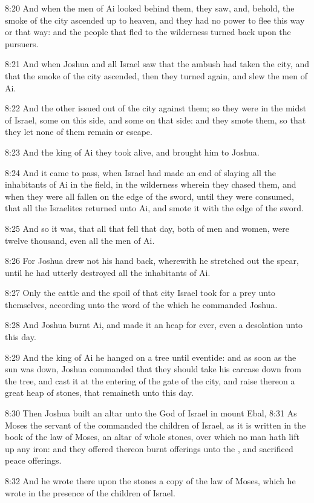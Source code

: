 8:20 And when the men of Ai looked behind them, they saw, and, behold, the smoke of the city ascended up to heaven, and they had no power to flee this way or that way: and the people that fled to the wilderness turned back upon the pursuers.

8:21 And when Joshua and all Israel saw that the ambush had taken the city, and that the smoke of the city ascended, then they turned again, and slew the men of Ai.

8:22 And the other issued out of the city against them; so they were in the midst of Israel, some on this side, and some on that side: and they smote them, so that they let none of them remain or escape.

8:23 And the king of Ai they took alive, and brought him to Joshua.

8:24 And it came to pass, when Israel had made an end of slaying all the inhabitants of Ai in the field, in the wilderness wherein they chased them, and when they were all fallen on the edge of the sword, until they were consumed, that all the Israelites returned unto Ai, and smote it with the edge of the sword.

8:25 And so it was, that all that fell that day, both of men and women, were twelve thousand, even all the men of Ai.

8:26 For Joshua drew not his hand back, wherewith he stretched out the spear, until he had utterly destroyed all the inhabitants of Ai.

8:27 Only the cattle and the spoil of that city Israel took for a prey unto themselves, according unto the word of the \LORD which he commanded Joshua.

8:28 And Joshua burnt Ai, and made it an heap for ever, even a desolation unto this day.

8:29 And the king of Ai he hanged on a tree until eventide: and as soon as the sun was down, Joshua commanded that they should take his carcase down from the tree, and cast it at the entering of the gate of the city, and raise thereon a great heap of stones, that remaineth unto this day.

8:30 Then Joshua built an altar unto the \LORD God of Israel in mount Ebal, 8:31 As Moses the servant of the \LORD commanded the children of Israel, as it is written in the book of the law of Moses, an altar of whole stones, over which no man hath lift up any iron: and they offered thereon burnt offerings unto the \LORD, and sacrificed peace offerings.

8:32 And he wrote there upon the stones a copy of the law of Moses, which he wrote in the presence of the children of Israel.

